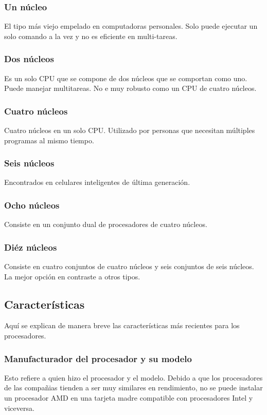\documentclass[letterpaper, 12pt]{article}
\begin{document}
\begin{justify}
        \subsubsection*{Un núcleo}
        \justify
        El tipo más viejo empelado en computadoras personales. Solo puede ejecutar un solo comando a la vez y no es eficiente en multi-tareas.
        \subsubsection*{Dos núcleos}
        \justify
        Es un solo CPU que se compone de dos núcleos que se comportan como uno. Puede manejar multitareas. No e muy robusto como un CPU de cuatro núcleos. 
        \subsubsection*{Cuatro núcleos}
        \justify
        Cuatro núcleos en un solo CPU. Utilizado por personas que necesitan múltiples programas al mismo tiempo.
        \subsubsection*{Seis núcleos}
        \justify
        Encontrados en celulares inteligentes de última generación.
        \subsubsection*{Ocho núcleos}
        \justify
        Consiste en un conjunto dual de procesadores de cuatro núcleos.
        \subsubsection*{Diéz núcleos}
        \justify
        Consiste en cuatro conjuntos de cuatro núcleos y seis conjuntos de seis núcleos. La mejor opción en contraste a otros tipos.

        \subsection{Características}
        \justify
        Aquí se explican de manera breve las características más recientes para los procesadores.
        \subsubsection*{Manufacturador del procesador y su modelo}
        \justify
        Esto refiere a quien hizo el procesador y el modelo. Debido a que los procesadores de las compañias tienden a ser muy similares en rendimiento,
        no se puede instalar un procesador AMD en una tarjeta madre compatible con procesadores Intel y viceversa.

\end{justify}
\end{document}
